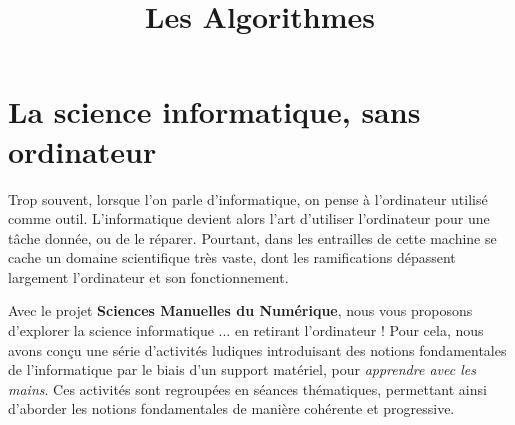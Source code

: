 \documentclass[a5paper,pagesize,DIV=14]{scrbook}
\title{Les Algorithmes}
\date{}
\begin{document}
\maketitle

\chapter*{La science informatique, sans ordinateur}


Trop souvent, lorsque l'on parle d'informatique, on pense à l'ordinateur utilisé comme outil. L'informatique devient alors l'art d'utiliser l'ordinateur pour une tâche donnée, ou de le réparer. Pourtant, dans les entrailles de cette machine se cache un domaine scientifique très vaste, dont les ramifications dépassent largement l'ordinateur et son fonctionnement.

Avec le projet \textbf{Sciences Manuelles du Numérique}, nous vous proposons d'explorer la science informatique ... en retirant l'ordinateur ! Pour cela, nous avons conçu une série d'activités ludiques introduisant des notions fondamentales de l'informatique par le biais d'un support matériel, pour \textit{apprendre avec les mains}. Ces activités sont regroupées en séances thématiques, permettant ainsi d'aborder les notions fondamentales de manière cohérente et progressive.
\end{document}
